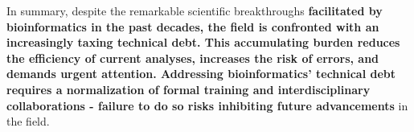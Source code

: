 In summary, despite the remarkable scientific breakthroughs \textbf{facilitated by bioinformatics in the past decades, the field is confronted with an increasingly taxing technical debt. This accumulating burden reduces the efficiency of current analyses, increases the risk of errors, and demands urgent attention. Addressing bioinformatics' technical debt requires a normalization of formal training and interdisciplinary collaborations - failure to do so risks inhibiting future advancements} in the field.






